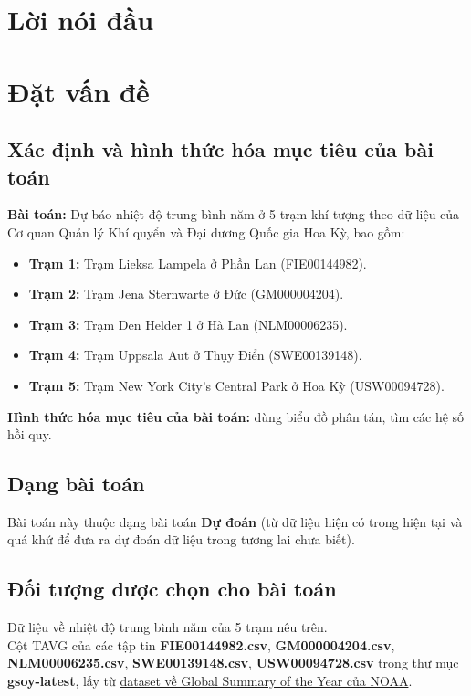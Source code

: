 \documentclass[a4paper]{article}
\begin{document}
\tableofcontents
\listoffigures
\listoftables
\newpage

\section*{Lời nói đầu}

\newpage

\section{Đặt vấn đề}
\subsection{Xác định và hình thức hóa mục tiêu của bài toán}
\textbf{Bài toán:} Dự báo nhiệt độ trung bình năm ở 5 trạm khí tượng theo dữ liệu của Cơ quan Quản lý Khí quyển và Đại dương Quốc gia Hoa Kỳ, bao gồm:
\begin{itemize}
\item \textbf{Trạm 1:} Trạm Lieksa Lampela ở Phần Lan (FIE00144982).
\item \textbf{Trạm 2:} Trạm Jena Sternwarte ở Đức (GM000004204).
\item \textbf{Trạm 3:} Trạm Den Helder 1 ở Hà Lan (NLM00006235).
\item \textbf{Trạm 4:} Trạm Uppsala Aut ở Thụy Điển (SWE00139148).
\item \textbf{Trạm 5:} Trạm New York City's Central Park ở Hoa Kỳ (USW00094728).
\end{itemize}
\textbf{Hình thức hóa mục tiêu của bài toán:} dùng biểu đồ phân tán, tìm các hệ số hồi quy.

\subsection{Dạng bài toán}
Bài toán này thuộc dạng bài toán \textbf{Dự đoán} (từ dữ liệu hiện có trong hiện tại và quá khứ để đưa ra dự đoán dữ liệu trong tương lai chưa biết).

\subsection{Đối tượng được chọn cho bài toán}
Dữ liệu về nhiệt độ trung bình năm của 5 trạm nêu trên.\\
Cột TAVG của các  tập tin \textbf{FIE00144982.csv}, \textbf{GM000004204.csv}, \textbf{NLM00006235.csv}, \textbf{SWE00139148.csv}, \textbf{USW00094728.csv}  trong thư mục \textbf{gsoy-latest}, lấy từ \href{https://www.ncei.noaa.gov/data/gsoy/archive/}{dataset về Global Summary of the Year của NOAA}.
\end{document}
